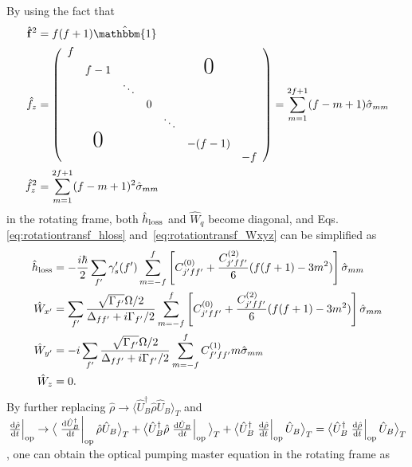 \documentclass[pra,twocolumn,floatfix,superscriptaddress]{revtex4-1} %
\newcommand{\dt}[1]{\frac{{\mathrm d} {#1}}{{\mathrm d}t}}
\newcommand{\expect}[1]{\big\langle #1 \big\rangle}
\begin{document}
\begin{appendix}
By using the fact that 
\begin{subequations}
\begin{align}
\hat{\mathbf{f}}^2 &=f(f+1)\hat{\mathbbm{1}}\\
\hat{f}_z &= \left(
    \begin{array}{ccccccc}
    f                                      		\\
      & f-1           &      & &      &\text{\huge0}\\
      &               &\ddots& 					\\
      &               &      &0                	\\
      &               &      & &\ddots          \\
      & \text{\huge0} &      & &      &-(f-1)   \\
      &               &      & &      &      &-f
    \end{array}
    \right)=\sum_{m=1}^{2f+1}(f-m+1)\hat{\sigma}_{mm}\\
\hat{f}_z^2 &= \sum_{m=1}^{2f+1}(f-m+1)^2\hat{\sigma}_{mm}
\end{align}
\end{subequations}
in the rotating frame, both $ \hat{h}_{\rm loss} $ and $ \hat{W}_{q} $ become diagonal, and Eqs.\eqref{eq:rotationtransf_hloss} and~\eqref{eq:rotationtransf_Wxyz} can be simplified as
\begin{subequations}
\begin{align}
\hat{h}_{\rm loss} &= -\frac{i\hbar}{2} \sum_{f'} \gamma'_s(f') \sum_{m=-f}^f\left[C_{j'ff'}^{(0)} + \frac{C_{j'ff'}^{(2) }}{6}(f(f+1)-3m^2) \right]\hat{\sigma}_{mm}\\
\hat{W}_{x'} &= \sum_{f'} \frac{\sqrt{\Gamma_{f'} }\Omega/2}{\Delta_{ff'}+i\Gamma_{f'}/2 } \sum_{m=-f}^f\left[C_{j'ff'}^{(0)} + \frac{C_{j'ff'}^{(2) }}{6}(f(f+1)-3m^2) \right]\hat{\sigma}_{mm}\\
\hat{W}_{y'} &= -i \sum_{f'} \frac{\sqrt{\Gamma_{f'} }\Omega/2}{\Delta_{ff'}+i\Gamma_{f'}/2 } \sum_{m=-f}^f C_{f'ff'}^{(1)}m\hat{\sigma}_{mm}\\
\hat{W}_z &=0.
\end{align}
\end{subequations}
By further replacing $ \hat{\rho}\rightarrow \expect{\hat{U}_B^\dagger \hat{\rho}\hat{U}_B }_T$ and $ \left. \dt{\hat{\rho}}\right|_{\rm op}\rightarrow \expect{\left.\dt{\hat{U}_B^\dagger}\right|_{\rm op}\hat{\rho}\hat{U}_B}_T + \expect{\hat{U}_B^\dagger\hat{\rho}\left. \dt{\hat{U}_B}\right|_{\rm op}}_T +\expect{\hat{U}_B^\dagger\left.\dt{\hat{\rho}}\right|_{\rm op}\hat{U}_B}_T= \expect{\hat{U}_B^\dagger\left.\dt{\hat{\rho}}\right|_{\rm op}\hat{U}_B}_T$, one can obtain the optical pumping master equation in the rotating frame as

\end{appendix}
\end{document}
